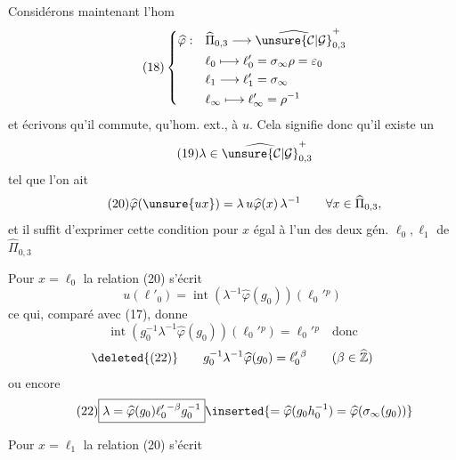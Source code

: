 
Considérons maintenant l'hom 
\[
\tag{18}
\left\{
\begin{aligned}
\widehat\varphi:\quad &\widehat\Pi_{0,3}\longrightarrow
  \widehat{\unsure{\mathcal C|\mathcal G}}_{0,3}^{+}\\
&\ell_0\longmapsto\ell'_0=\sigma_\infty\rho=\varepsilon_0\\
&\ell_1\longrightarrow\ell'_1=\sigma_\infty\\
&\ell_\infty\longmapsto\ell'_\infty=\rho^{-1}
\end{aligned}
\right.
\]
et écrivons qu'il commute,  qu'hom. ext., à $u$.
Cela signifie donc qu'il existe un
\[
\tag{19}
\lambda\in\widehat{\unsure{\mathcal C|\mathcal G}}_{0,3}^{+}
\]
tel que l'on ait
\[
\tag{20}
\widehat\varphi(\unsure{ux})=\lambda\,u\widehat\varphi(x)\,\lambda^{-1}
\qquad \forall x\in\widehat\Pi_{0,3},
\]
et il suffit d'exprimer cette condition pour $x$ égal à l'un des deux
gén. $\ell_0,\ell_1$ de $\widehat\Pi_{0,3}$

Pour $x=\ell_0$ la relation (20) s'écrit
\[
\tag{21}
u(\ell'_0)=\operatorname{int}(\lambda^{-1}\widehat\varphi(g_0))(\ell_0'{}^{p})
\]
ce qui, comparé avec (17), donne
\[
\operatorname{int}(g_0^{-1}\lambda^{-1}\widehat\varphi(g_0))(\ell_0'{}^{p})
=\ell_0'{}^{p}\quad\text{donc}
\]
\[
\deleted{(22)}\qquad
g_0^{-1}\lambda^{-1}\widehat\varphi(g_0)=\ell_0'{}^{\beta}
\qquad(\beta\in\widehat{\mathbb Z})
\]
ou encore
\[
\tag{22}
\boxed{\lambda=\widehat\varphi(g_0)\ell_0'{}^{-\beta}g_0^{-1}}
\inserted{=\widehat\varphi(g_0h_0^{-1})=\widehat\varphi(\sigma_\infty(g_0))}
\]

Pour $x=\ell_1$ la relation (20) s'écrit


